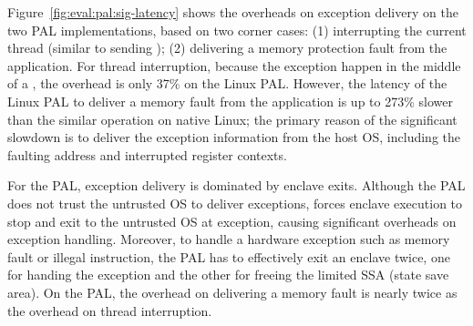 Figure~\ref{fig:eval:pal:sig-latency} shows the overheads
on exception delivery
on the two PAL implementations,
based on two corner cases:
(1) interrupting the current thread (similar to sending );
(2) delivering a memory protection fault
from the application.
For thread interruption,
because the exception happen in the middle of a \hostapi{},
the overhead is only 37\%
on the Linux PAL.
However,
the latency of the Linux PAL
to deliver a memory fault from the application
is up to 273\% slower
than the similar operation on native Linux;
the primary reason of
the significant slowdown
is to deliver the exception information
from the host OS,
including the faulting address
and interrupted register contexts.








For the \sgx{} PAL,
exception delivery is dominated
by enclave exits.
Although the \sgx{} PAL does not trust the untrusted OS to deliver exceptions,
\sgx{} forces
enclave execution
to stop and exit to the untrusted OS
at exception,
causing significant overheads
on exception handling.
Moreover, to handle a hardware exception such as memory fault or illegal instruction,
the \sgx{} PAL has to
effectively exit an enclave twice,
one for handing the exception and
the other for freeing
the limited SSA (state save area).
On the \sgx{} PAL,
the overhead on delivering a memory fault
is nearly twice as the overhead on thread interruption. 



